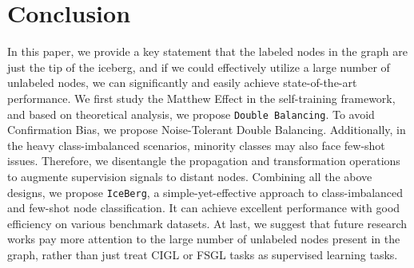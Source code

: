 \section{Conclusion}
\label{sec:conclusion}

In this paper, we provide a key statement that the labeled nodes in the graph are just the tip of the iceberg, and if we could effectively utilize a large number of unlabeled nodes, we can significantly and easily achieve state-of-the-art performance. We first study the Matthew Effect in the self-training framework, and based on theoretical analysis, we propose \texttt{Double Balancing}. To avoid Confirmation Bias, we propose Noise-Tolerant Double Balancing. Additionally, in the heavy class-imbalanced scenarios, minority classes may also face few-shot issues. Therefore, we disentangle the propagation and transformation operations to augmente supervision signals to distant nodes. Combining all the above designs, we propose \texttt{IceBerg}, a simple-yet-effective approach to class-imbalanced and few-shot node classification. It can achieve excellent performance with good efficiency on various benchmark datasets. At last, we suggest that future research works pay more attention to the large number of unlabeled nodes present in the graph, rather than just treat CIGL or FSGL tasks as supervised learning tasks.